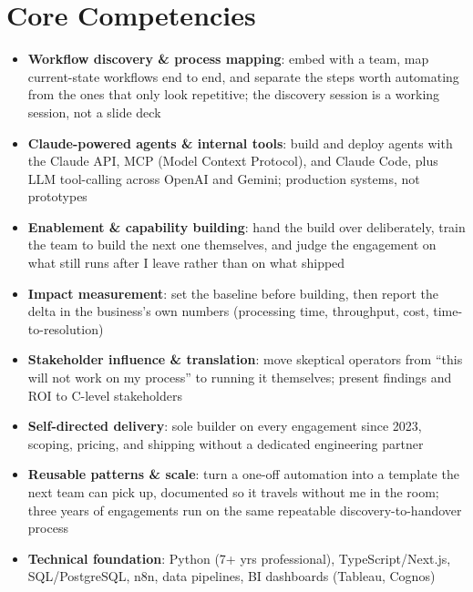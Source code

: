 \documentclass[11pt,a4paper,sans]{moderncv}
\begin{document}
\section{Core Competencies}
\vspace{1pt}
\begin{itemize}

\item \textbf{Workflow discovery \& process mapping}: embed with a team, map current-state workflows end to end, and separate the steps worth automating from the ones that only look repetitive; the discovery session is a working session, not a slide deck

\item \textbf{Claude-powered agents \& internal tools}: build and deploy agents with the Claude API, MCP (Model Context Protocol), and Claude Code, plus LLM tool-calling across OpenAI and Gemini; production systems, not prototypes

\item \textbf{Enablement \& capability building}: hand the build over deliberately, train the team to build the next one themselves, and judge the engagement on what still runs after I leave rather than on what shipped

\item \textbf{Impact measurement}: set the baseline before building, then report the delta in the business's own numbers (processing time, throughput, cost, time-to-resolution)

\item \textbf{Stakeholder influence \& translation}: move skeptical operators from ``this will not work on my process'' to running it themselves; present findings and ROI to C-level stakeholders

\item \textbf{Self-directed delivery}: sole builder on every engagement since 2023, scoping, pricing, and shipping without a dedicated engineering partner

\item \textbf{Reusable patterns \& scale}: turn a one-off automation into a template the next team can pick up, documented so it travels without me in the room; three years of engagements run on the same repeatable discovery-to-handover process

\item \textbf{Technical foundation}: Python (7+ yrs professional), TypeScript/Next.js, SQL/PostgreSQL, n8n, data pipelines, BI dashboards (Tableau, Cognos)

\end{itemize}
\end{document}
